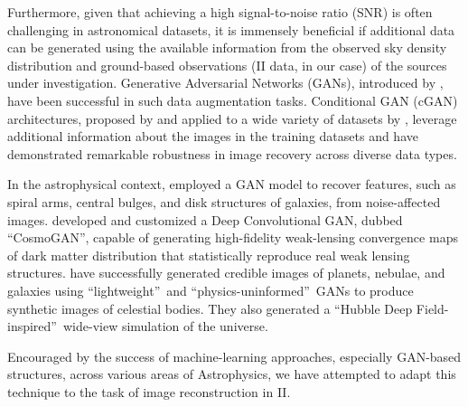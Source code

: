 Furthermore, given that achieving a high signal-to-noise ratio (SNR) is often challenging in astronomical datasets, it is immensely beneficial if additional data can be generated using the available information from the observed sky density distribution and ground-based observations (II data, in our case) of the sources under investigation. Generative Adversarial Networks (GANs), introduced by \cite{goodfellow2014generative}, have been successful in such data augmentation tasks. Conditional GAN (cGAN) architectures, proposed by \cite{mirza2014conditional} and applied to a wide variety of datasets by \cite{isola2017image}, leverage additional information about the images in the training datasets and have demonstrated remarkable robustness in image recovery across diverse data types.

In the astrophysical context, \cite{schawinski2017galaxypics} employed a GAN model to recover features, such as spiral arms, central bulges, and disk structures of galaxies, from noise-affected images. \cite{mustafa2019cosmogan} developed and customized a Deep Convolutional GAN, dubbed \textquotedblleft CosmoGAN\textquotedblright, capable of generating high-fidelity weak-lensing convergence maps of dark matter distribution that statistically reproduce real weak lensing structures. \cite{coccomini2021lightweightgan} have successfully generated credible images of planets, nebulae, and galaxies using \textquotedblleft lightweight\textquotedblright\ and \textquotedblleft physics-uninformed\textquotedblright\ GANs to produce synthetic images of celestial bodies. They also generated a \textquotedblleft Hubble Deep Field-inspired\textquotedblright\ wide-view simulation of the universe. 

Encouraged by the success of machine-learning approaches, especially GAN-based structures, across various areas of Astrophysics, we have attempted to adapt this technique to the task of image reconstruction in II. 

